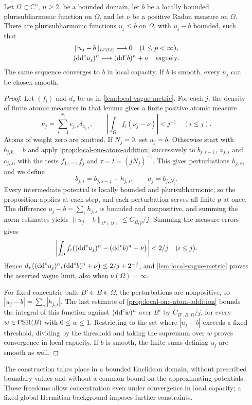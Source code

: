 \begin{theorem}\label{thm:local-prescribed-excess}
Let $\Omega\subset\mathbb C^n$, $n\geq2$, be a bounded domain, let $b$ be a locally bounded plurisubharmonic function on $\Omega$, and let $\nu$ be a positive Radon measure on $\Omega$. There are plurisubharmonic functions $u_j\leq b$ on $\Omega$, with $u_j-b$ bounded, such that
\[
 \begin{gathered}
 \|u_j-b\|_{L^p(\Omega)}\longrightarrow0\quad(1\leq p<\infty),\\
 (\mathrm{dd}^{\mathrm{c}} u_j)^n\longrightarrow(\mathrm{dd}^{\mathrm{c}} b)^n+\nu
                    \quad\text{vaguely}.
 \end{gathered}
\]
The same sequence converges to $b$ in local capacity. If $b$ is smooth, every $u_j$ can be chosen smooth.
\end{theorem}
\begin{proof}
Let $(f_i)$ and $d_v$ be as in \cref{lem:local-vague-metric}. For each $j$, the density of finite atomic measures in that lemma gives a finite positive atomic measure
\[
 \nu_j=\sum_{s=1}^{N_j}c_{j,s}\delta_{a_{j,s}},\qquad
 \left|\int_\Omega f_i(\nu_j-\nu)\right|<j^{-1}\quad(i\leq j).
\]
Atoms of weight zero are omitted. If $N_j=0$, set $u_j=b$. Otherwise start with $b_{j,0}=b$ and apply \cref{prop:local-one-atom-addition} successively to $b_{j,s-1}$, $a_{j,s}$ and $c_{j,s}$, with the tests $f_1,\ldots,f_j$ and $\tau=t=(jN_j)^{-1}$. This gives perturbations $h_{j,s}$, and we define
\[
 b_{j,s}=b_{j,s-1}+h_{j,s},\qquad u_j=b_{j,N_j}.
\]
Every intermediate potential is locally bounded and plurisubharmonic, so the proposition applies at each step, and each perturbation serves all finite $p$ at once. The difference $u_j-b=\sum_sh_{j,s}$ is bounded and nonpositive, and summing the norm estimates yields $\|u_j-b\|_{L^p(\Omega)}\leq C_{\Omega,p}/j$. Summing the measure errors gives
\[
 \left|\int_\Omega f_i\bigl((\mathrm{dd}^{\mathrm{c}} u_j)^n-(\mathrm{dd}^{\mathrm{c}} b)^n-\nu\bigr)\right|
       <2/j\quad(i\leq j).
\]
Hence $d_v\bigl((\mathrm{dd}^{\mathrm{c}} u_j)^n,(\mathrm{dd}^{\mathrm{c}} b)^n+\nu\bigr)\leq2/j+2^{-j}$, and \cref{lem:local-vague-metric} proves the asserted vague limit, also when $\nu(\Omega)=\infty$.

For fixed concentric balls $B'\Subset B\Subset\Omega$, the perturbations are nonpositive, so $|u_j-b|=\sum_s|h_{j,s}|$. The last estimate of \cref{prop:local-one-atom-addition} bounds the integral of this function against $(\mathrm{dd}^{\mathrm{c}} w)^n$ over $B'$ by $C_{B',B,\Omega}/j$, for every $w\in\mathrm{PSH}(B)$ with $0\leq w\leq1$. Restricting to the set where $|u_j-b|$ exceeds a fixed threshold, dividing by the threshold and taking the supremum over $w$ proves convergence in local capacity. If $b$ is smooth, the finite sums defining $u_j$ are smooth as well.
\end{proof}

The construction takes place in a bounded Euclidean domain, without prescribed boundary values and without a common bound on the approximating potentials. These freedoms allow concentration even under convergence in local capacity; a fixed global Hermitian background imposes further constraints.
